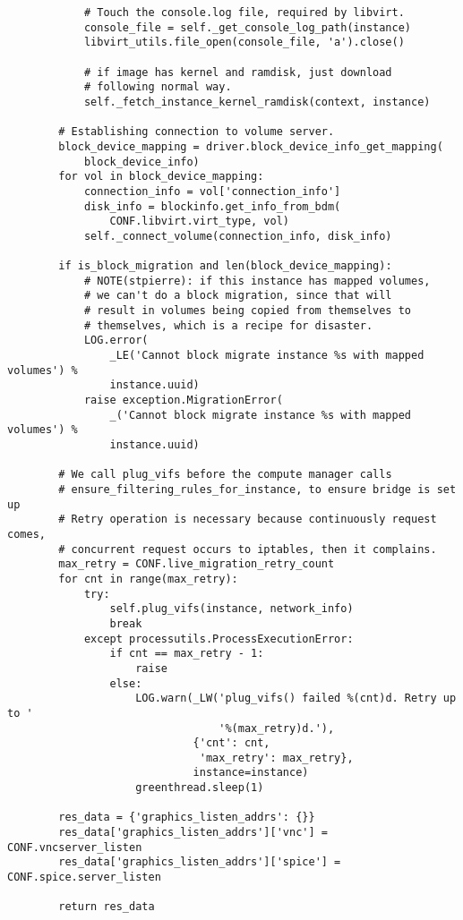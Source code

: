 \documentclass[a4paper,left=1.5cm,right=1.5cm,11pt]{article}
\begin{document}
\begin{lstlisting}
            # Touch the console.log file, required by libvirt.
            console_file = self._get_console_log_path(instance)
            libvirt_utils.file_open(console_file, 'a').close()

            # if image has kernel and ramdisk, just download
            # following normal way.
            self._fetch_instance_kernel_ramdisk(context, instance)

        # Establishing connection to volume server.
        block_device_mapping = driver.block_device_info_get_mapping(
            block_device_info)
        for vol in block_device_mapping:
            connection_info = vol['connection_info']
            disk_info = blockinfo.get_info_from_bdm(
                CONF.libvirt.virt_type, vol)
            self._connect_volume(connection_info, disk_info)

        if is_block_migration and len(block_device_mapping):
            # NOTE(stpierre): if this instance has mapped volumes,
            # we can't do a block migration, since that will
            # result in volumes being copied from themselves to
            # themselves, which is a recipe for disaster.
            LOG.error(
                _LE('Cannot block migrate instance %s with mapped volumes') %
                instance.uuid)
            raise exception.MigrationError(
                _('Cannot block migrate instance %s with mapped volumes') %
                instance.uuid)

        # We call plug_vifs before the compute manager calls
        # ensure_filtering_rules_for_instance, to ensure bridge is set up
        # Retry operation is necessary because continuously request comes,
        # concurrent request occurs to iptables, then it complains.
        max_retry = CONF.live_migration_retry_count
        for cnt in range(max_retry):
            try:
                self.plug_vifs(instance, network_info)
                break
            except processutils.ProcessExecutionError:
                if cnt == max_retry - 1:
                    raise
                else:
                    LOG.warn(_LW('plug_vifs() failed %(cnt)d. Retry up to '
                                 '%(max_retry)d.'),
                             {'cnt': cnt,
                              'max_retry': max_retry},
                             instance=instance)
                    greenthread.sleep(1)

        res_data = {'graphics_listen_addrs': {}}
        res_data['graphics_listen_addrs']['vnc'] = CONF.vncserver_listen
        res_data['graphics_listen_addrs']['spice'] = CONF.spice.server_listen

        return res_data
    \end{lstlisting}
\end{document}
